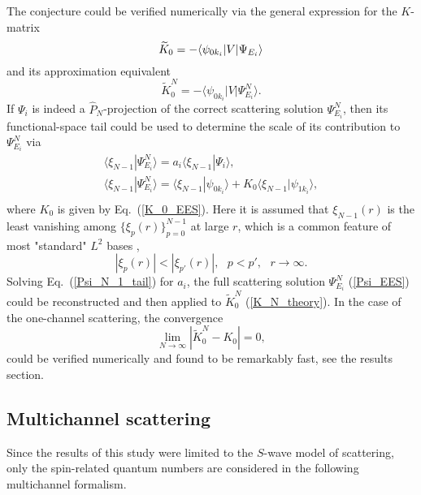 \documentclass[aip
, pra
, showpacs
, aps
, twocolumn
, groupedaddress
, floatfix
]{revtex4}
\newcommand{\beq}{\begin{equation}}
\newcommand{\eeq}{\end{equation}}
\newcommand{\barr}{\begin{array}}
\newcommand{\earr}{\end{array}}
\begin{document}
The conjecture could be verified numerically via the general expression for the $K$-matrix \cite{N82}
\beq
\widetilde{K}_0 = -\langle \psi_{0k_i} | V | \Psi_{E_i} \rangle\\
\label{K_theory}\eeq
and its approximation equivalent
\beq
\widetilde{K}^N_0 = -\langle \psi_{0k_i} | V | \Psi^N_{E_i} \rangle.
\label{K_N_theory}\eeq
If $\Psi_i$ is indeed a $\hat{P}_N$-projection of the correct scattering solution $\Psi^N_{E_i}$,
then its functional-space tail could be used to
determine the scale of its contribution to $\Psi^N_{E_i}$ via
\beq \barr{l}
\langle \xi_{N-1} | \Psi^N_{E_i}\rangle
= a_i \langle \xi_{N-1}| \Psi_i \rangle,\\
\langle \xi_{N-1} | \Psi^N_{E_i}\rangle
 =  \langle \xi_{N-1}| \psi_{0k_i} \rangle
+ K_0 \langle \xi_{N-1}| \psi_{1k_i} \rangle,\\
\earr \label{Psi_N_1_tail} \eeq
where $K_0$ is given by Eq.~(\ref{K_0_EES}).
Here it is assumed that $\xi_{N-1}(r)$ is the least vanishing among $\{\xi_p(r)\}_{p=0}^{N-1}$  at large $r$, which is
a common feature of most "standard" $L^2$ bases \cite{abramowitz},
\beq
|\xi_p(r)| < |\xi_{p'}(r)|, \ \ \ p<p', \ \ \ r \rightarrow \infty.
\eeq
Solving Eq.~(\ref{Psi_N_1_tail}) for $a_i$,
the full scattering solution $\Psi^N_{E_i}$ (\ref{Psi_EES}) could be reconstructed and then applied to $\widetilde{K}^N_0$ (\ref{K_N_theory}).
In the case of the one-channel scattering, the convergence
\beq
\lim_{N \rightarrow \infty} |\widetilde{K}^N_0 - K_0 | = 0,
\label{K_N_0_lim} \eeq
could be verified numerically and found to be
remarkably fast, see the results section.



\subsection{Multichannel scattering}
Since the results of this study were limited to the $S$-wave model of scattering,
only the spin-related quantum numbers are considered in the
following multichannel formalism.
\end{document}
